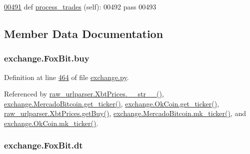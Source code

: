 \begin{DoxyCode}
\hypertarget{classexchange_1_1_fox_bit.tex_l00491}{}\hyperlink{classexchange_1_1_fox_bit_a244f81e91b04a1118d2d17f6c8497cb5}{00491}     \textcolor{keyword}{def }\hyperlink{classexchange_1_1_fox_bit_a244f81e91b04a1118d2d17f6c8497cb5}{process\_trades} (self):
00492         \textcolor{keywordflow}{pass}
00493      
\end{DoxyCode}


\subsection{Member Data Documentation}
\subsubsection[{\texorpdfstring{buy}{buy}}]{\setlength{\rightskip}{0pt plus 5cm}exchange.\+Fox\+Bit.\+buy}\hypertarget{classexchange_1_1_fox_bit_acb7e709cc05e8314b1bdacd32e4dfc80}{}\label{classexchange_1_1_fox_bit_acb7e709cc05e8314b1bdacd32e4dfc80}


Definition at line \hyperlink{exchange_8py_source_l00464}{464} of file \hyperlink{exchange_8py_source}{exchange.\+py}.



Referenced by \hyperlink{raw__urlparser_8py_source_l00074}{raw\+\_\+urlparser.\+Xbt\+Prices.\+\_\+\+\_\+str\+\_\+\+\_\+()}, \hyperlink{exchange_8py_source_l00535}{exchange.\+Mercado\+Bitcoin.\+get\+\_\+ticker()}, \hyperlink{exchange_8py_source_l00600}{exchange.\+Ok\+Coin.\+get\+\_\+ticker()}, \hyperlink{raw__urlparser_8py_source_l00062}{raw\+\_\+urlparser.\+Xbt\+Prices.\+get\+Buy()}, \hyperlink{exchange_8py_source_l00549}{exchange.\+Mercado\+Bitcoin.\+mk\+\_\+ticker()}, and \hyperlink{exchange_8py_source_l00614}{exchange.\+Ok\+Coin.\+mk\+\_\+ticker()}.

\subsubsection[{\texorpdfstring{dt}{dt}}]{\setlength{\rightskip}{0pt plus 5cm}exchange.\+Fox\+Bit.\+dt}\hypertarget{classexchange_1_1_fox_bit_a363f8488eb0423f88519c085ae6f168f}{}\label{classexchange_1_1_fox_bit_a363f8488eb0423f88519c085ae6f168f}


